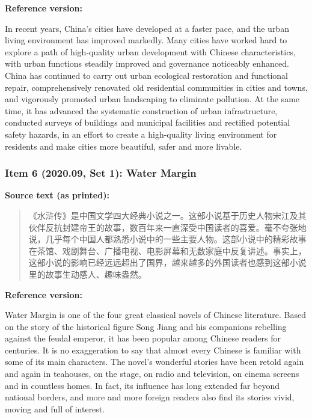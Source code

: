 \noindent\textbf{Reference version:}
\par\smallskip
\noindent In recent years, China's cities have developed at a faster pace, and the urban living environment has improved markedly. Many cities have worked hard to explore a path of high-quality urban development with Chinese characteristics, with urban functions steadily improved and governance noticeably enhanced. China has continued to carry out urban ecological restoration and functional repair, comprehensively renovated old residential communities in cities and towns, and vigorously promoted urban landscaping to eliminate pollution. At the same time, it has advanced the systematic construction of urban infrastructure, conducted surveys of buildings and municipal facilities and rectified potential safety hazards, in an effort to create a high-quality living environment for residents and make cities more beautiful, safer and more livable.
\par\medskip

\subsubsection*{Item 6 (2020.09, Set 1): Water Margin}

\noindent\textbf{Source text (as printed):}
\begin{quote}
《水浒传》是中国文学四大经典小说之一。这部小说基于历史人物宋江及其伙伴反抗封建帝王的故事，数百年来一直深受中国读者的喜爱。毫不夸张地说，几乎每个中国人都熟悉小说中的一些主要人物。这部小说中的精彩故事在茶馆、戏剧舞台、广播电视、电影屏幕和无数家庭中反复讲述。事实上，这部小说的影响已经远远超出了国界，越来越多的外国读者也感到这部小说里的故事生动感人、趣味盎然。
\end{quote}

\noindent\textbf{Reference version:}
\par\smallskip
\noindent Water Margin is one of the four great classical novels of Chinese literature. Based on the story of the historical figure Song Jiang and his companions rebelling against the feudal emperor, it has been popular among Chinese readers for centuries. It is no exaggeration to say that almost every Chinese is familiar with some of its main characters. The novel's wonderful stories have been retold again and again in teahouses, on the stage, on radio and television, on cinema screens and in countless homes. In fact, its influence has long extended far beyond national borders, and more and more foreign readers also find its stories vivid, moving and full of interest.
\par\medskip


